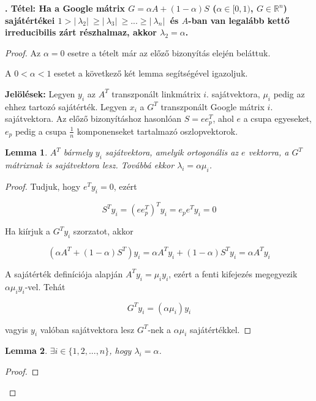 \documentclass[12pt,a4paper]{article}
\newcounter{tszam}
\newenvironment{tetel}[1]
{{\medskip}\noindent \stepcounter{tszam}
{\bfseries{\thetszam. Tétel: #1\\[1ex]}}}{\bigskip }
\newtheorem{lemma}{Lemma}
\begin{document}
\begin{tetel}{Ha a Google mátrix $G = \alpha A + (1-\alpha)S$ ($\alpha \in [0,1)$, $G \in \mathbb{R}^n$) sajátértékei $ 1 > |\ \lambda_2 |\ \geq |\ \lambda_3 |\ \geq ... \geq |\ \lambda_n |\ $ és $A$-ban van legalább kettő irreducibilis zárt részhalmaz, akkor $\lambda_2 = \alpha$. }
\end{tetel}
\begin{proof}
	Az $\alpha = 0$ esetre a tételt már az előző bizonyítás elején beláttuk.
	
	A $0 < \alpha < 1$ esetet a következő két lemma segítségével igazoljuk.
	
	\vspace{0.1cm}
	\textbf{Jelölések:} Legyen $y_i$ az $A^T$ transzponált linkmátrix $i.$ sajátvektora, $\mu_i$ pedig az ehhez tartozó sajátérték. Legyen $x_i$ a $G^T$ transzponált Google mátrix $i.$ sajátvektora. Az előző bizonyításhoz hasonlóan $S = e e_p^T$, ahol $e$ a csupa egyeseket, $e_p$ pedig a csupa $\frac{1}{n}$ komponenseket tartalmazó oszlopvektorok.
	
	\begin{lemma}
		$A^T$ bármely $y_i$ sajátvektora, amelyik ortogonális az $e$ vektorra, a $G^T$ mátrixnak is sajátvektora lesz. Továbbá ekkor $\lambda_i = \alpha \mu_i$.
	\end{lemma}
	\vspace{-0.5cm}
	\begin{proof}
		Tudjuk, hogy $e^T y_i = 0$, ezért
		
		\[ S^T y_i = (e e_p^T)^T y_i = e_p e^T y_i = 0 \]
		
		Ha kiírjuk a $G^T y_i$ szorzatot, akkor
		
		\[ (\alpha A^T + (1-\alpha) S^T ) y_i = \alpha A^T y_i + (1-\alpha) S^T y_i = \alpha A^T y_i \]
		
		A sajátérték definíciója alapján $A^T y_i = \mu_i y_i$, ezért a fenti kifejezés megegyezik $\alpha \mu_i y_i$-vel. Tehát
		
		\[ G^T y_i = (\alpha \mu_i) y_i \]
		
		vagyis $y_i$ valóban sajátvektora lesz $G^T$-nek a $\alpha \mu_i$ sajátértékkel.
		\phantom\qedhere
	\end{proof} 

	\begin{lemma}
		$\exists i \in \{ 1,2,...,n \}$, hogy $\lambda_i = \alpha$.
	\end{lemma}
	\vspace{-0.5cm}
	\begin{proof}
		
		\phantom\qedhere
	\end{proof} 
\end{proof}
\end{document}
